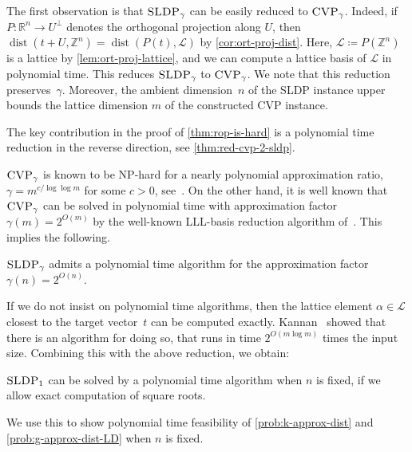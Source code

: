 \documentclass[a4paper,USenglish,cleveref,numberwithinsect]{lipics-v2021}
\DeclareMathOperator{\dist}{dist}
\newcommand{\ZZ}{\mathbb{Z}}
\newcommand{\RR}{\mathbb{R}}
\numberwithin{equation}{section}
\begin{document}
The first observation is that $\textsc{SLDP}_\gamma$ can be easily reduced to $\textsc{CVP}_\gamma$.
Indeed, if $P:\RR^n\rightarrow U^\perp$ denotes the orthogonal projection along $U$, then
$\dist(t+U,\ZZ^n)=\dist(P(t),\mathcal{L})$ by \cref{cor:ort-proj-dist}.
Here, $\mathcal{L}\coloneqq P(\ZZ^n)$ is a lattice by \cref{lem:ort-proj-lattice},
and we can compute a lattice basis of $\mathcal{L}$ in polynomial time. %
This reduces $\textsc{SLDP}_\gamma$ to  $\textsc{CVP}_\gamma$.
We note that this reduction preserves~$\gamma$.
Moreover, the ambient dimension~$n$ of the \textsc{SLDP} instance
upper bounds the lattice dimension $m$ of the constructed \textsc{CVP} instance.

The key contribution in the proof of \cref{thm:rop-is-hard}
is a polynomial time reduction in the reverse direction,
see \cref{thm:red-cvp-2-sldp}.

$\textsc{CVP}_\gamma$ is known to be \textsc{NP}-hard for a nearly polynomial approximation ratio,
$\gamma=m^{c/\log\log m}$ for some $c>0$, see~\cite{dinurcvp}.
On the other hand, it is well known that
$\textsc{CVP}_{\gamma}$ can be solved in polynomial time
with approximation factor $\gamma(m) = 2^{O(m)}$
by the well-known LLL-basis reduction algorithm of~\cite{lll}.
This implies the following.

\begin{corollary}\label{cor:sldp-exact}
\label{cor:sldp-in-p-for-two-to-n}
 $\textsc{SLDP}_\gamma$ admits a polynomial time algorithm for the
 approximation factor $\gamma(n) = 2^{O(n)}$.
\end{corollary}

If we do not insist on polynomial time algorithms,
then the lattice element $\alpha\in\mathcal{L}$ closest to the target vector~$t$
can be computed exactly.
Kannan~\cite{kannan1987} showed that there is an algorithm for doing so,
that runs in time $2^{O(m\log m)}$ times the input size.
Combining this with the above reduction, we obtain:

\begin{corollary}\label{cor:sldp-fixed-dimension}
$\textsc{SLDP}_1$ can be solved by a polynomial time algorithm
when $n$ is fixed, if we allow exact computation of square roots.
\end{corollary}

We use this to show polynomial time feasibility of
\cref{prob:k-approx-dist} and \cref{prob:g-approx-dist-LD}
when $n$ is fixed.
\end{document}
